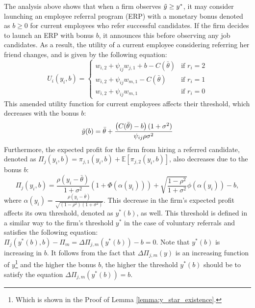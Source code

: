 \documentclass[12pt]{article}
\begin{document}
The analysis above shows that when a firm observes $\Tilde{y} \geq y^*$, it may consider launching an employee referral program (ERP) with a monetary bonus denoted as $b \geq 0$ for current employees who refer successful candidates. If the firm decides to launch an ERP with bonus $b$, it announces this before observing any job candidates. As a result, the utility of a current employee considering referring her friend changes, and is given by the following equation:
\begin{equation}
        U_{i}(y_i, b) = 
        \begin{cases}
		w_{i,2} + \psi_{ij} w_{j,1}+ b - C(\bar{\theta}) & \text{if } r_i = 2 \\ %
		w_{i,2} + \psi_{ij} w_{m,1} - C(\bar{\theta}) & \text{if } r_i = 1 \\
        w_{i,2} + \psi_{ij} w_{m,1} & \text{if } r_i = 0
        \end{cases}
\end{equation}
This amended utility function for current employees affects their threshold, which decreases with the bonus $b$:
\begin{equation}\label{eq_tilde_y_b}
    \Tilde{y}(b) = \bar{\theta}+\frac{\left(C(\bar{\theta})-b\right)(1+\sigma^2)}{\psi_{ij}\rho\sigma^2}
\end{equation}
Furthermore, the expected profit for the firm from hiring a referred candidate, denoted as $\Pi_j(y_i,b) = \pi_{j,1}(y_i, b)+ \mathbb{E}[\pi_{j,2}(y_i,b)]$, also decreases due to the bonus $b$:
\begin{equation}
\Pi_j(y_i, b)
= \frac{\rho\left(y_i-\bar{\theta}\right)}{1+\sigma^2}\left(1+\Phi\left(\alpha(y_i)\right)\right)
+ \sqrt{\frac{1-\rho^2}{1+\sigma^2}}\phi\left(\alpha(y_i)\right)-b,
\end{equation}
where $\alpha(y_i) = \frac{\rho\left(y_i - \bar{\theta}\right)}{\sqrt{(1-\rho^2)(1+\sigma^2)}}$. This decrease in the firm's expected profit affects its own threshold, denoted as $y^*(b)$, as well. This threshold is defined in a similar way to the firm's threshold $y^*$ in the case of voluntary referrals and satisfies the following equation: $\Pi_j(y^*(b),b) - \Pi_m = \Delta\Pi_{j,m}\left(y^*(b)\right)-b = 0$. Note that $y^*(b)$ is increasing in $b$. It follows from the fact that $\Delta\Pi_{j,m}(y)$ is an increasing function of $y$\footnote{Which is shown in the Proof of Lemma \ref{lemma:y_star_existence}.} and the higher the bonus $b$, the higher the threshold $y^*(b)$ should be to satisfy the equation $\Delta\Pi_{j,m}\left(y^*(b)\right)=b$.
\end{document}
